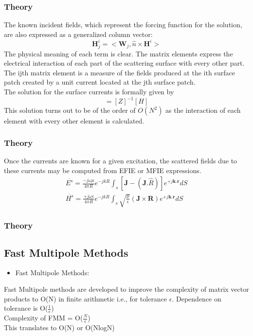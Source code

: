 \documentclass{beamer}
\begin{document}
\begin{frame}
\frametitle{Theory}
The known incident fields, which represent the forcing function for the solution, are also expressed as a generalized column vector:
\begin{equation}
\textbf{H}_j^i = <\textbf{W}_j,\hat{n}\times\textbf{H}^i>
\end{equation}
The physical meaning of each term is clear. The matrix elements express the electrical interaction of each part of the scattering surface with every other part. The ijth matrix element is a measure of the fields produced at the ith surface patch created by a unit current located at the jth surface patch.\\
The solution for the surface currents is formally given by 
\begin{equation}
[b] = [Z]^{-1}[H]
\end{equation}
This solution turns out to be of the order of $O(N^2)$ as the interaction of each element with every other element is calculated.
\end{frame}
\begin{frame}
\frametitle{Theory}
Once the currents are known for a given excitation, the scattered fields due to these currents may be computed from EFIE or MFIE expressions. 
\begin{eqnarray}
\overline{E^s} = \frac{-j\omega\mu}{4\pi R}e^{-jkR}\int_s [\textbf{J} - (\textbf{J}.\hat{R})]e^{+j\textbf{k}.\textbf{r}}dS \\
\overline{H^s} = \frac{+j\omega\epsilon}{4\pi R}e^{-jkR}\int_s \sqrt{\frac{\mu}{\epsilon}}(\textbf{J}\times\textbf{R})e^{+j\textbf{k}.\textbf{r}}dS
\end{eqnarray}
\end{frame}

\begin{frame}
\frametitle{Theory}
\subsection{Fast Multipole Methods}
\begin{itemize}
\item Fast Multipole Methods:
\end{itemize}
Fast Multipole methods are developed to improve the complexity of matrix vector products to O(N) in finite arithmetic i.e., for tolerance $\epsilon$. Dependence on tolerance is O($\frac{1}{\epsilon}$)\\
Complexity of FMM = O($\frac{N}{\epsilon}$)\\
This translates to O(N) or O(NlogN)\\
\end{frame}
\end{document}

